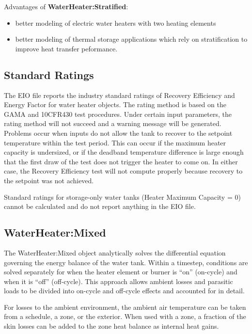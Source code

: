 Advantages of \textbf{WaterHeater:Stratified}:

\begin{itemize}
\item
  better modeling of electric water heaters with two heating elements
\item
  better modeling of thermal storage applications which rely on stratification to improve heat transfer peformance.
\end{itemize}

\subsection{Standard Ratings}\label{standard-ratings}

The EIO file reports the industry standard ratings of Recovery Efficiency and Energy Factor for water heater objects. The rating method is based on the GAMA and 10CFR430 test procedures. Under certain input parameters, the rating method will not succeed and a warning message will be generated. Problems occur when inputs do not allow the tank to recover to the setpoint temperature within the test period. This can occur if the maximum heater capacity is undersized, or if the deadband temperature difference is large enough that the first draw of the test does not trigger the heater to come on. In either case, the Recovery Efficiency test will not compute properly because recovery to the setpoint was not achieved.

Standard ratings for storage-only water tanks (Heater Maximum Capacity = 0) cannot be calculated and do not report anything in the EIO file.

\subsection{WaterHeater:Mixed}\label{waterheatermixed}

The WaterHeater:Mixed object analytically solves the differential equation governing the energy balance of the water tank. Within a timestep, conditions are solved separately for when the heater element or burner is ``on'' (on-cycle) and when it is ``off'' (off-cycle). This approach allows ambient losses and parasitic loads to be divided into on-cycle and off-cycle effects and accounted for in detail.

For losses to the ambient environment, the ambient air temperature can be taken from a schedule, a zone, or the exterior. When used with a zone, a fraction of the skin losses can be added to the zone heat balance as internal heat gains.

